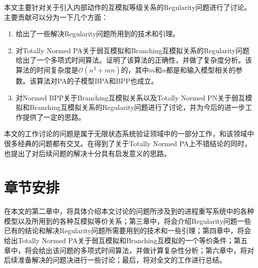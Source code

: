 本文主要针对关于引入内部动作的互模拟等级关系的Regularity问题进行了讨论。主要贡献可以分为一下几个方面：

\begin{enumerate}
	\item 给出了一些解决Regularity问题所用到的技术和引理。
	\item 对Totally Normed PA关于弱互模拟和Branching互模拟关系的Regularity问题给出了一个多项式时间算法。证明了该算法的正确性，并做了复杂度分析。该算法的时间复杂度是$\mathscr{O}(n^3+mn)$的，其中$m$和$n$都是和输入模型相关的参数。该算法对PA的子模型BPA和BPP也成立。
	\item 对Normed BPP关于Branching互模拟关系以及Totally Normed PN关于弱互模拟和Branching互模拟关系的Regularity问题进行了讨论，并为今后的进一步工作提供了一定的思路。
\end{enumerate}

本文的工作讨论的问题是属于无限状态系统验证领域中的一部分工作，和该领域中很多经典的问题都有交叉。在得到了关于Totally Normed PA上不错结论的同时，也提出了对后续问题的解决十分具有启发意义的思路。

\section{章节安排}
\label{sec:section}

在本文的第二章中，将具体介绍本文讨论的问题所涉及到的进程重写系统中的各种模型以及所用到的各种互模拟等价关系；第三章中，将会介绍Regularity问题一些已有的结论和解决Regularity问题所需要用到的技术和一些引理；第四章中，将会给出Totally Normed PA关于弱互模拟和Branching互模拟的一个等价条件；第五章中，将会给出该问题的多项式时间算法，并做计算复杂性分析；第六章中，将对后续准备解决的问题决进行一些讨论；最后，将对全文的工作进行总结。
